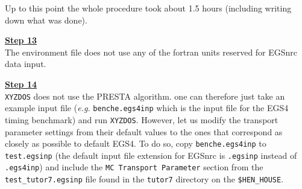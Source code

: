 
Up to this point the whole procedure took about 1.5 hours (including
writing down what was done).

\noindent
\underline{\bf Step 13} \hfill \\
The environment file does not use any of the fortran units
reserved for EGSnrc data input.

\noindent
\underline{\bf Step 14} \hfill \\
{\tt XYZDOS} does not use the PRESTA algorithm. one can therefore
just take an example input file ({\em e.g.} {\tt benche.egs4inp}
which is the input file for the EGS4 timing benchmark) and
run {\tt XYZDOS}. However, let us modify the transport
parameter settings from their default values to the ones
that correspond as closely as possible to default EGS4. To do so,
copy {\tt benche.egs4inp} to {\tt test.egsinp} (the default
input file extension for EGSnrc is {\tt .egsinp} instead
of {\tt .egs4inp}) and include the {\tt MC Transport Parameter}
section from the {\tt test\_tutor7.egsinp} file found in
the {\tt tutor7} directory on the {\tt \$HEN\_HOUSE}.

